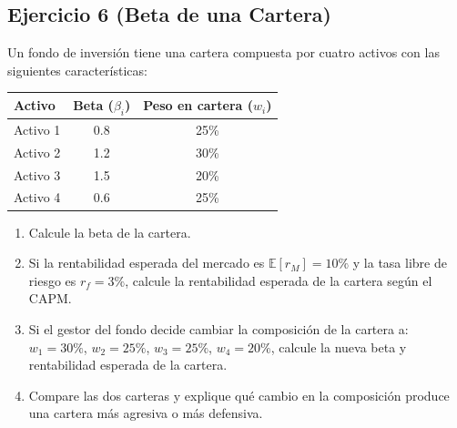 \documentclass[12pt,a4paper]{article}
\newcommand{\E}{\mathbb{E}}
\newenvironment{ejercicio}[1]{\subsection*{Ejercicio #1}}{}
\begin{document}
\begin{ejercicio}{6 (Beta de una Cartera)}
Un fondo de inversión tiene una cartera compuesta por cuatro activos con las siguientes características:
\begin{center}
\begin{tabular}{lcc}
\toprule
Activo & Beta ($\beta_i$) & Peso en cartera ($w_i$) \\
\midrule
Activo 1 & 0.8 & 25\% \\
Activo 2 & 1.2 & 30\% \\
Activo 3 & 1.5 & 20\% \\
Activo 4 & 0.6 & 25\% \\
\bottomrule
\end{tabular}
\end{center}

\begin{enumerate}[label=\alph*)]
  \item Calcule la beta de la cartera.
  \item Si la rentabilidad esperada del mercado es $\E[r_M] = 10\%$ y la tasa libre de riesgo es $r_f = 3\%$, calcule la rentabilidad esperada de la cartera según el CAPM.
  \item Si el gestor del fondo decide cambiar la composición de la cartera a: $w_1 = 30\%$, $w_2 = 25\%$, $w_3 = 25\%$, $w_4 = 20\%$, calcule la nueva beta y rentabilidad esperada de la cartera.
  \item Compare las dos carteras y explique qué cambio en la composición produce una cartera más agresiva o más defensiva.
\end{enumerate}
\end{ejercicio}
\end{document}
